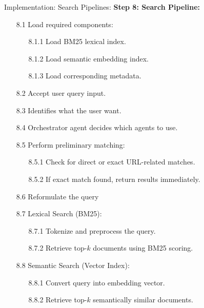 \begin{frame}{Implementation: Search Pipelines:}
    \textbf{Step 8: Search Pipeline:}
    \begin{itemize}
    
        \item[8.1] Load required components:
              \begin{itemize}
                  \item[8.1.1] Load BM25 lexical index.
                  \item[8.1.2] Load semantic embedding index.
                  \item[8.1.3] Load corresponding metadata.
              \end{itemize}
    
        \item[8.2] Accept user query input.

        \item[8.3] Identifies what the user want.

        \item[8.4] Orchestrator agent decides which agents to use. 
    
        \item[8.5] Perform preliminary matching:
              \begin{itemize}
                  \item[8.5.1] Check for direct or exact URL-related matches.
                  \item[8.5.2] If exact match found, return results immediately.
              \end{itemize}

        \item[8.6] Reformulate the query
    
        \item[8.7] Lexical Search (BM25):
              \begin{itemize}
                  \item[8.7.1] Tokenize and preprocess the query.
                  \item[8.7.2] Retrieve top-$k$ documents using BM25 scoring.
              \end{itemize}
    
        \item[8.8] Semantic Search (Vector Index):
              \begin{itemize}
                  \item[8.8.1] Convert query into embedding vector.
                  \item[8.8.2] Retrieve top-$k$ semantically similar documents.
              \end{itemize}
    \end{itemize}
\end{frame}

